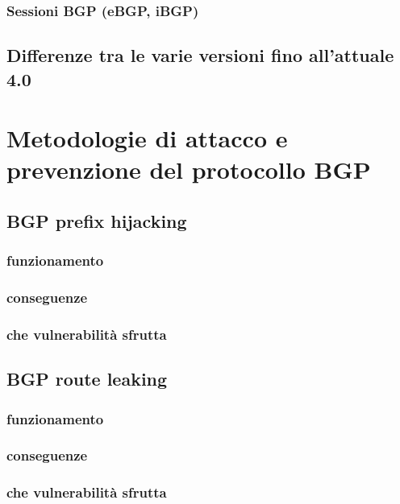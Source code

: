 \documentclass[12pt,a4paper,twoside]{book}
\begin{document}
\subsection{Sessioni BGP (eBGP, iBGP)}

\section{Differenze tra le varie versioni fino all'attuale 4.0}

\chapter{Metodologie di attacco e prevenzione del protocollo BGP}

\section{BGP prefix hijacking}

\subsection{funzionamento}

\subsection{conseguenze}

\subsection{che vulnerabilità sfrutta}

\section{BGP route leaking}

\subsection{funzionamento}

\subsection{conseguenze}

\subsection{che vulnerabilità sfrutta}
\end{document}
